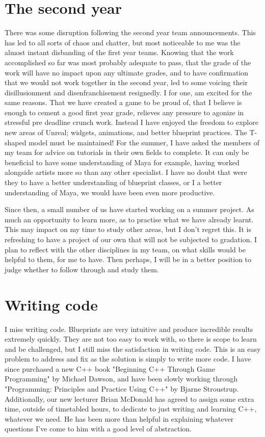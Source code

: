 \documentclass{scrartcl}
\begin{document}
\section*{The second year}

There was some disruption following the second year team announcements. This has led to all sorts of chaos and chatter, but most noticeable to me was the almost instant disbanding of the first year teams. Knowing that the work accomplished so far was most probably adequate to pass, that the grade of the work will have no impact upon any ultimate grades, and to have confirmation that we would not work together in the second year, led to some voicing their disillusionment and disenfranchisement resignedly. I for one, am excited for the same reasons. That we have created a game to be proud of, that I believe is enough to cement a good first year grade, relieves any pressure to agonize in stressful pre deadline crunch work. Instead I have enjoyed the freedom to explore new areas of Unreal; widgets, animations, and better blueprint practices.  The T-shaped model must be maintained! For the summer, I have asked the members of my team for advice on tutorials in their own fields to complete. It can only be beneficial to have some understanding of Maya for example, having worked alongside artists more so than any other specialist. I have no doubt that were they to have a better understanding of blueprint classes, or I a better understanding of Maya, we would have been even more productive.

Since then, a small number of us have started working on a summer project.  As much an opportunity to learn more, as to practise what we have already learnt.  This may impact on my time to study other areas, but I don't regret this.  It is refreshing to have a project of our own that will not be subjected to gradation.  I plan to reflect with the other disciplines in my team, on what skills would be helpful to them, for me to have.  Then perhaps, I will be in a better position to judge whether to follow through and study them.

\section*{Writing code}

I miss writing code. Blueprints are very intuitive and produce incredible results extremely quickly. They are not too easy to work with, so there is scope to learn and be challenged, but I still miss the satisfaction in writing code. This is an easy problem to address and fix as the solution is simply to write more code. I have since purchased a new C++ book "Beginning C++ Through Game Programming" by Michael Dawson, and have been slowly working through "Programming: Principles and Practice Using C++" by Bjarne Stroustrup. Additionally, our new lecturer Brian McDonald has agreed to assign some extra time, outside of timetabled hours, to dedicate to just writing and learning C++, whatever we need. He has been more than helpful in explaining whatever questions I've come to him with a good level of abstraction.
\end{document}
